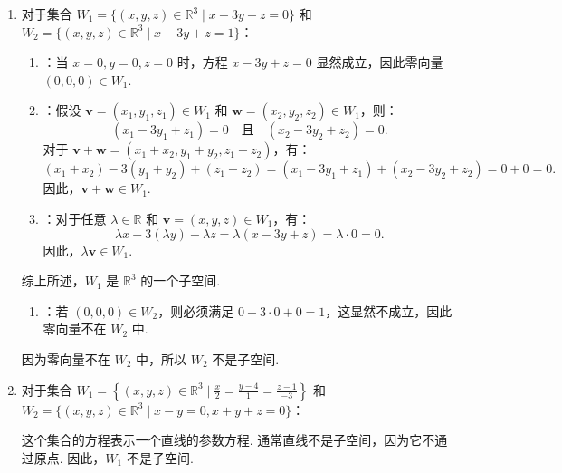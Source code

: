 \begin{exercise}
\begin{exgroup}
\begin{answer}
\begin{enumerate}
                \item 对于集合 $W_1 = \{(x, y, z) \in \mathbb{R}^3 \mid x - 3y + z = 0\}$ 和 $W_2 = \{(x, y, z) \in \mathbb{R}^3 \mid x - 3y + z = 1\}$：
                \begin{enumerate}
                    \item {}：当 $x = 0, y = 0, z = 0$ 时，方程 $x - 3y + z = 0$ 显然成立，因此零向量 $(0, 0, 0) \in W_1$.
                    \item {}：假设 $\mathbf{v} = (x_1, y_1, z_1) \in W_1$ 和 $\mathbf{w} = (x_2, y_2, z_2) \in W_1$，则：
                    \[
                    (x_1 - 3y_1 + z_1) = 0 \quad \text{且} \quad (x_2 - 3y_2 + z_2) = 0.
                    \]
                    对于 $\mathbf{v} + \mathbf{w} = (x_1 + x_2, y_1 + y_2, z_1 + z_2)$，有：
                    \[
                    (x_1 + x_2) - 3(y_1 + y_2) + (z_1 + z_2) = (x_1 - 3y_1 + z_1) + (x_2 - 3y_2 + z_2) = 0 + 0 = 0.
                    \]
                    因此，$\mathbf{v} + \mathbf{w} \in W_1$.
                    \item {}：对于任意 $\lambda \in \mathbb{R}$ 和 $\mathbf{v} = (x, y, z) \in W_1$，有：
                    \[
                    \lambda x - 3(\lambda y) + \lambda z = \lambda(x - 3y + z) = \lambda \cdot 0 = 0.
                    \]
                    因此，$\lambda \mathbf{v} \in W_1$.
                \end{enumerate}
                综上所述，$W_1$ 是 $\mathbb{R}^3$ 的一个子空间.
                \begin{enumerate}
                    \item {}：若 $(0, 0, 0) \in W_2$，则必须满足 $0 - 3 \cdot 0 + 0 = 1$，这显然不成立，因此零向量不在 $W_2$ 中.
                \end{enumerate}
                因为零向量不在 $W_2$ 中，所以 $W_2$ 不是子空间.

                \item 对于集合 $W_1 = \left\{(x, y, z) \in \mathbb{R}^3 \mid \frac{x}{2} = \frac{y - 4}{1} = \frac{z - 1}{-3} \right\}$ 和 $W_2 = \{(x, y, z) \in \mathbb{R}^3 \mid x - y = 0, x + y + z = 0\}$：

                这个集合的方程表示一个直线的参数方程. 通常直线不是子空间，因为它不通过原点. 因此，$W_1$ 不是子空间.


\end{enumerate}
\end{answer}
\end{exgroup}
\end{exercise}
